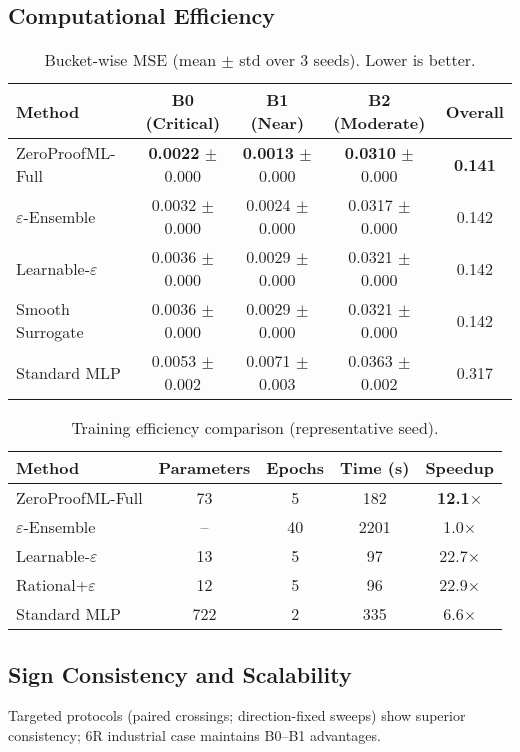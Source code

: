 \documentclass[twoside,11pt]{article}
\begin{document}
\subsection{Computational Efficiency}
\begin{table}[t]
\centering
\caption{Bucket-wise MSE (mean $\pm$ std over 3 seeds). Lower is better.}
\label{tab:bucket_mse}
\begin{tabular}{lcccc}
\toprule
Method & B0 (Critical) & B1 (Near) & B2 (Moderate) & Overall \\
\midrule
ZeroProofML-Full & \textbf{0.0022} $\pm$ 0.000 & \textbf{0.0013} $\pm$ 0.000 & \textbf{0.0310} $\pm$ 0.000 & \textbf{0.141} \\
$\varepsilon$-Ensemble & 0.0032 $\pm$ 0.000 & 0.0024 $\pm$ 0.000 & 0.0317 $\pm$ 0.000 & 0.142 \\
Learnable-$\varepsilon$ & 0.0036 $\pm$ 0.000 & 0.0029 $\pm$ 0.000 & 0.0321 $\pm$ 0.000 & 0.142 \\
Smooth Surrogate & 0.0036 $\pm$ 0.000 & 0.0029 $\pm$ 0.000 & 0.0321 $\pm$ 0.000 & 0.142 \\
Standard MLP & 0.0053 $\pm$ 0.002 & 0.0071 $\pm$ 0.003 & 0.0363 $\pm$ 0.002 & 0.317 \\
\bottomrule
\end{tabular}
\end{table}

\begin{table}[t]
\centering
\caption{Training efficiency comparison (representative seed).}
\label{tab:efficiency}
\begin{tabular}{lcccc}
\toprule
Method & Parameters & Epochs & Time (s) & Speedup \\
\midrule
ZeroProofML-Full & 73 & 5 & 182 & \textbf{12.1$\times$} \\
$\varepsilon$-Ensemble & -- & 40 & 2201 & 1.0$\times$ \\
Learnable-$\varepsilon$ & 13 & 5 & 97 & 22.7$\times$ \\
Rational+$\varepsilon$ & 12 & 5 & 96 & 22.9$\times$ \\
Standard MLP & 722 & 2 & 335 & 6.6$\times$ \\
\bottomrule
\end{tabular}
\end{table}

\subsection{Sign Consistency and Scalability}
Targeted protocols (paired crossings; direction-fixed sweeps) show superior consistency; 6R industrial case maintains B0--B1 advantages.
\end{document}
